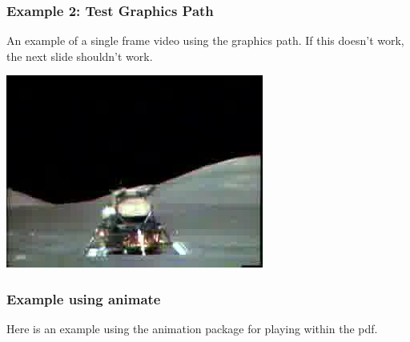 \documentclass{beamer}
\begin{document}
\begin{frame}
    \frametitle{Example 2: Test Graphics Path}
    
    An example of a single frame video using the graphics path.
    If this doesn't work, the next slide shouldn't work.
    
    \vspace{20pt}
    
    \includegraphics[height=0.7\textheight]{outputFrame_16.jpeg}
\end{frame}



\begin{frame}

\frametitle{Example using animate}
Here is an example using the animation package for playing within the pdf.
\begin{figure}
\end{figure}
\end{frame}


%     
% 
%     
% 
% 
%     
% 
% 
%     
\end{document}
